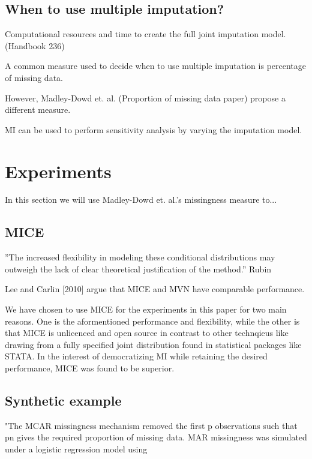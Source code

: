 \documentclass{article}
\begin{document}
	
	\subsection{When to use multiple imputation?}
	Computational resources and time to create the full joint imputation model. (Handbook 236)
	
	A common measure used to decide when to use multiple imputation is percentage of missing data.
	
	However, Madley-Dowd et. al. (Proportion of missing data paper) propose a different measure.
	
	MI can be used to perform sensitivity analysis by varying the imputation model.
	
	\section{Experiments}
	In this section we will use Madley-Dowd et. al.'s missingness measure to...
	
	\subsection{MICE}
	''The
	increased flexibility in modeling these conditional distributions may outweigh
	the lack of clear theoretical justification of the method.'' Rubin
	
	Lee and Carlin  [2010] argue that MICE and MVN have comparable performance.
	
	We have chosen to use MICE for the experiments in this paper for two main reasons. One is the aformentioned performance and flexibility, while the other is that MICE is unlicenced and open source in contrast to other technqieus like drawing from a fully specified joint distribution found in statistical packages like STATA. In the interest of democratizing MI while retaining the desired performance, MICE was found to be superior.
	
	\subsection{Synthetic example}
	
	
	"The MCAR missingness mechanism
	removed the first p observations such that pn gives the
	required proportion of missing data. MAR missingness
	was simulated under a logistic regression model using
	
\end{document}
